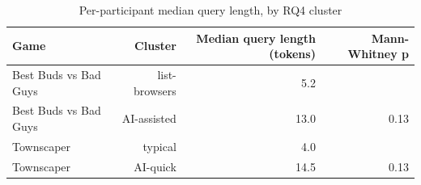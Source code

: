 \begin{table}[t]
\centering
\caption{Per-participant median query length, by RQ4 cluster}
\label{tab:rq7-query-length-by-cluster}
\begin{tabular}{lrrr}
\toprule
Game & Cluster & Median query length (tokens) & Mann-Whitney p \\
\midrule
Best Buds vs Bad Guys & list-browsers & 5.2 &  \\
Best Buds vs Bad Guys & AI-assisted & 13.0 & 0.13 \\
Townscaper & typical & 4.0 &  \\
Townscaper & AI-quick & 14.5 & 0.13 \\
\bottomrule
\end{tabular}
\end{table}
